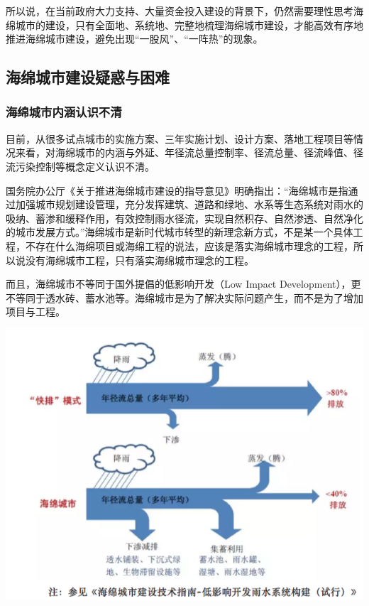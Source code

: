 \documentclass[]{book}
\begin{document}
所以说，在当前政府大力支持、大量资金投入建设的背景下，仍然需要理性思考海绵城市的建设，只有全面地、系统地、完整地梳理海绵城市建设，才能高效有序地推进海绵城市建设，避免出现``一股风''、``一阵热''的现象。

\hypertarget{ux6d77ux7ef5ux57ceux5e02ux5efaux8bbeux7591ux60d1ux4e0eux56f0ux96be}{%
\subsection{海绵城市建设疑惑与困难}\label{ux6d77ux7ef5ux57ceux5e02ux5efaux8bbeux7591ux60d1ux4e0eux56f0ux96be}}

\hypertarget{ux6d77ux7ef5ux57ceux5e02ux5185ux6db5ux8ba4ux8bc6ux4e0dux6e05}{%
\subsubsection{海绵城市内涵认识不清}\label{ux6d77ux7ef5ux57ceux5e02ux5185ux6db5ux8ba4ux8bc6ux4e0dux6e05}}

目前，从很多试点城市的实施方案、三年实施计划、设计方案、落地工程项目等情况来看，对海绵城市的内涵与外延、年径流总量控制率、径流总量、径流峰值、径流污染控制等概念定义认识不清。

国务院办公厅《关于推进海绵城市建设的指导意见》明确指出：``海绵城市是指通过加强城市规划建设管理，充分发挥建筑、道路和绿地、水系等生态系统对雨水的吸纳、蓄渗和缓释作用，有效控制雨水径流，实现自然积存、自然渗透、自然净化的城市发展方式。''海绵城市是新时代城市转型的新理念新方式，不是某一个具体工程，不存在什么海绵项目或海绵工程的说法，应该是落实海绵城市理念的工程，所以说没有海绵城市工程，只有落实海绵城市理念的工程。

而且，海绵城市不等同于国外提倡的低影响开发（Low Impact Development），更不等同于透水砖、蓄水池等。海绵城市是为了解决实际问题产生，而不是为了增加项目与工程。

\includegraphics[width=8.33in]{images/hm2}
\end{document}
